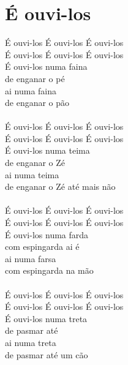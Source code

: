 \documentclass{article}
\begin{document}
\section{ É ouvi-los}
É ouvi-los É ouvi-los É ouvi-los\\
É ouvi-los É ouvi-los É ouvi-los\\
É ouvi-los numa faina\\
de enganar o pé\\
ai numa faina\\
de enganar o pão\\
\\
É ouvi-los É ouvi-los É ouvi-los\\
É ouvi-los É ouvi-los É ouvi-los\\
É ouvi-los numa teima\\
de enganar o Zé\\
ai numa teima\\
de enganar o Zé até mais não\\
\\
É ouvi-los É ouvi-los É ouvi-los\\
É ouvi-los É ouvi-los É ouvi-los\\
É ouvi-los numa farda\\
com espingarda ai é\\
ai numa farsa\\
com espingarda na mão\\
\\
É ouvi-los É ouvi-los É ouvi-los\\
É ouvi-los É ouvi-los É ouvi-los\\
É ouvi-los numa treta\\
de pasmar até\\
ai numa treta\\
de pasmar até um cão\\
\end{document}
